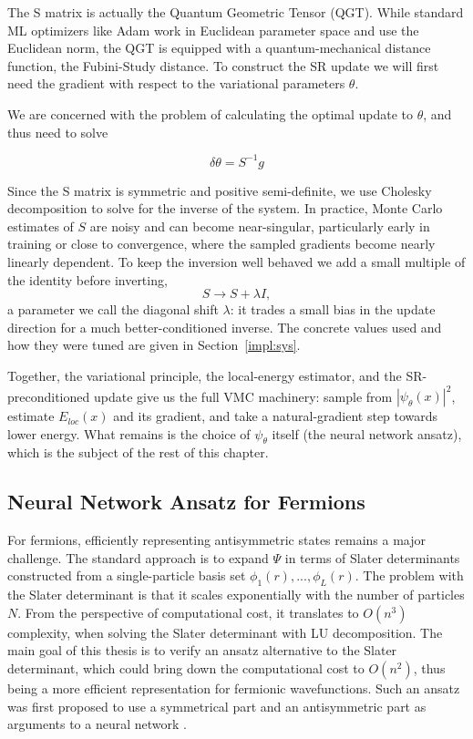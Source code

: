 \documentclass[a4paper,11pt,twoside]{article}
\begin{document}
The S matrix is actually the Quantum Geometric Tensor (QGT). While standard ML optimizers like Adam work in Euclidean parameter space and use the Euclidean norm, the QGT is equipped with a quantum-mechanical distance function, the Fubini-Study distance.
To construct the SR update we will first need the gradient with respect to the variational parameters $\theta$.

We are concerned with the problem of calculating the optimal update to $\theta$, and thus need to solve

\begin{equation}
    \delta \theta = S^{-1} g
\end{equation}

Since the S matrix is symmetric and positive semi-definite, we use Cholesky decomposition to solve for the inverse of the system. In practice, Monte Carlo estimates of $S$ are noisy and can become near-singular, particularly early in training or close to convergence, where the sampled gradients become nearly linearly dependent. To keep the inversion well behaved we add a small multiple of the identity before inverting,
\begin{equation}
    S \rightarrow S + \lambda I,
\end{equation}
a parameter we call the diagonal shift $\lambda$: it trades a small bias in the update direction for a much better-conditioned inverse. The concrete values used and how they were tuned are given in Section~\ref{impl:sys}.

Together, the variational principle, the local-energy estimator, and the SR-preconditioned update give us the full VMC machinery: sample from $|\psi_\theta(x)|^2$, estimate $E_{loc}(x)$ and its gradient, and take a natural-gradient step towards lower energy. What remains is the choice of $\psi_\theta$ itself (the neural network ansatz), which is the subject of the rest of this chapter.

\newpage


\subsection{Neural Network Ansatz for Fermions}
\label{sec:nn_ansatz}

For fermions, efficiently representing antisymmetric states remains a major challenge. The standard approach is to expand $\Psi$ in terms of Slater determinants constructed from a single-particle basis set $\phi_1(r), ..., \phi_L(r)$.
The problem with the Slater determinant is that it scales exponentially with the number of particles $N$. From the perspective of computational cost, it translates to $O(n^3)$ complexity, when solving the Slater determinant with LU decomposition. The main goal of this thesis is to verify an ansatz alternative to the Slater determinant, which could bring down the computational cost to $O(n^2)$, thus being a more efficient representation for fermionic wavefunctions. Such an ansatz was first proposed to use a symmetrical part and an antisymmetric part as arguments to a neural network \cite{fu_minimal_2025}.
\end{document}
